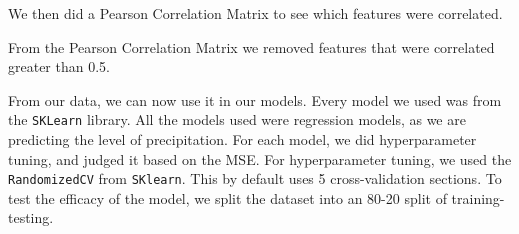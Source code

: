 \documentclass[../report.tex]{subfiles}
\begin{document}
We then did a Pearson Correlation Matrix to see which features were correlated.
\begin{figure}
    \centering

    \label{fig:pearson_corr}
\end{figure}
From the Pearson Correlation Matrix we removed features that were correlated greater than 0.5.

From our data, we can now use it in our models.
Every model we used was from the \verb|SKLearn| library.
All the models used were regression models, as we are predicting the level of precipitation.
For each model, we did hyperparameter tuning, and judged it based on the MSE.
For hyperparameter tuning, we used the \verb|RandomizedCV| from \verb|SKlearn|.
This by default uses 5 cross-validation sections.
To test the efficacy of the model, we split the dataset into an 80-20 split of training-testing.
\end{document}
